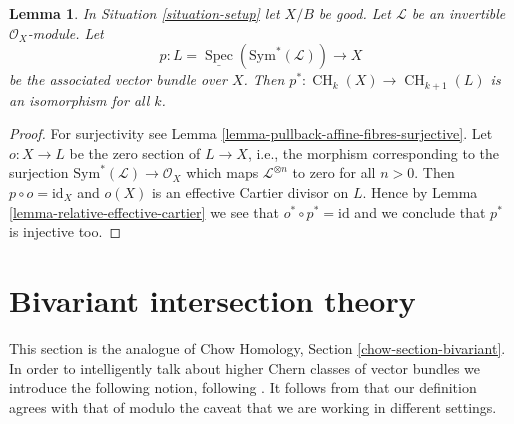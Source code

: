 \documentclass{stacks-project}
\theoremstyle{plain}
\newtheorem{lemma}[subsection]{Lemma}
\theoremstyle{definition}
\theoremstyle{remark}
\numberwithin{equation}{subsection}
\def\Spec{\mathop{\mathrm{Spec}}}
\def\CH{\mathop{\mathrm{CH}}\nolimits}
\begin{document}
\begin{lemma}
\label{lemma-linebundle}
In Situation \ref{situation-setup} let $X/B$ be good.
Let $\mathcal{L}$ be an invertible $\mathcal{O}_X$-module.
Let
$$
p :
L = \underline{\Spec}(\text{Sym}^*(\mathcal{L}))
\longrightarrow
X
$$
be the associated vector bundle over $X$.
Then $p^* : \CH_k(X) \to \CH_{k + 1}(L)$ is an isomorphism for all $k$.
\end{lemma}

\begin{proof}
For surjectivity see Lemma \ref{lemma-pullback-affine-fibres-surjective}.
Let $o : X \to L$ be the zero section of $L \to X$, i.e., the morphism
corresponding to the surjection $\text{Sym}^*(\mathcal{L}) \to \mathcal{O}_X$
which maps $\mathcal{L}^{\otimes n}$ to zero for all $n > 0$.
Then $p \circ o = \text{id}_X$ and $o(X)$ is an effective
Cartier divisor on $L$. Hence by Lemma \ref{lemma-relative-effective-cartier}
we see that $o^* \circ p^* = \text{id}$ and we conclude that $p^*$ is
injective too.
\end{proof}























\section{Bivariant intersection theory}
\label{section-bivariant}

\noindent
This section is the analogue of
Chow Homology, Section \ref{chow-section-bivariant}.
In order to intelligently talk about higher Chern classes of vector
bundles we introduce the following notion, following \cite{FM}.
It follows from \cite[Theorem 17.1]{F} that our definition agrees
with that of \cite{F} modulo the caveat that we are working in different
settings.
\end{document}
